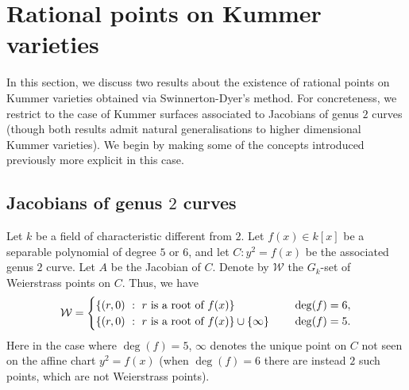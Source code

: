 \documentclass[10pt]{amsart}
\numberwithin{equation}{section}
\newtheorem{lemma}[equation]{Lemma}
\theoremstyle{remark}
\theoremstyle{definition}
\theoremstyle{definition}
\theoremstyle{definition}
\theoremstyle{definition}
\theoremstyle{definition}
\theoremstyle{definition}
\theoremstyle{definition}
\theoremstyle{definition}
\begin{document}
\section{Rational points on Kummer varieties}

%
%

In this section, we discuss two results about the existence of rational points on Kummer varieties obtained via Swinnerton-Dyer's method. For concreteness, we restrict to the case of Kummer surfaces associated to Jacobians of genus $2$ curves (though both results admit natural generalisations to higher dimensional Kummer varieties). We begin by making some of the concepts introduced previously more explicit in this case.


\subsection{Jacobians of genus $2$ curves} \label{ssec:genus_2}
Let $k$ be a  field of characteristic different from $2$. 
Let $f(x)\in k[x]$ be a separable polynomial of degree $5$ or $6$, and let $C:y^2=f(x)$ be the associated genus $2$ curve. Let $A$ be the Jacobian of $C$. Denote by $\mathcal{W}$ the $G_k$-set of Weierstrass points on $C$. Thus, we have 
\[\mathcal{W}=\begin{cases}\{(r,0)~:~r \textup{ is a root of }f(x) \} ~~&~~\deg(f)=6,\\ 
\{(r,0)~:~r \textup{ is a root of }f(x) \}\cup \{\infty\}~~&~~\deg(f)=5.\end{cases}\]
Here in the case where $\deg(f)=5$, $\infty$ denotes the unique point on $C$ not seen on the affine chart $y^2=f(x)$ (when $\deg(f)=6$  there are instead $2$ such points, which are not Weierstrass points). 
\end{document}
